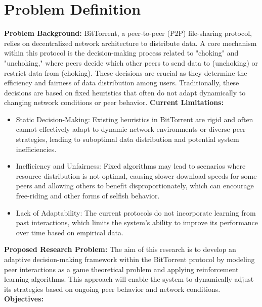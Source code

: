 \documentclass{article}
\begin{document}
\section{Problem Definition}
\textbf{Problem Background:}
BitTorrent, a peer-to-peer (P2P) file-sharing protocol, relies on decentralized network architecture to distribute data. A core mechanism within this protocol is the decision-making process related to "choking" and "unchoking," where peers decide which other peers to send data to (unchoking) or restrict data from (choking). These decisions are crucial as they determine the efficiency and fairness of data distribution among users. Traditionally, these decisions are based on fixed heuristics that often do not adapt dynamically to changing network conditions or peer behavior.
\newline
\newline
\textbf{Current Limitations:}
\begin {itemize}
\item
Static Decision-Making: Existing heuristics in BitTorrent are rigid and often cannot effectively adapt to dynamic network environments or diverse peer strategies, leading to suboptimal data distribution and potential system inefficiencies.
\item
Inefficiency and Unfairness: Fixed algorithms may lead to scenarios where resource distribution is not optimal, causing slower download speeds for some peers and allowing others to benefit disproportionately, which can encourage free-riding and other forms of selfish behavior.
\item
Lack of Adaptability: The current protocols do not incorporate learning from past interactions, which limits the system’s ability to improve its performance over time based on empirical data.
\end {itemize}
\textbf{Proposed Research Problem:}
The aim of this research is to develop an adaptive decision-making framework within the BitTorrent protocol by modeling peer interactions as a game theoretical problem and applying reinforcement learning algorithms. This approach will enable the system to dynamically adjust its strategies based on ongoing peer behavior and network conditions.
\newline
\newline
\textbf{Objectives:}
\end{document}
